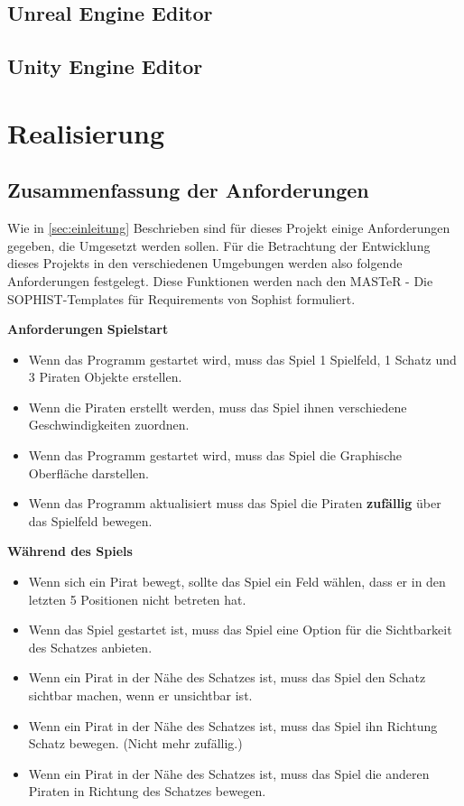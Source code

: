 \documentclass[
	12pt, %
	a4paper,
	listof=totoc, %
	bibliography=totoc, %
	numbers=noenddot, %
	ngerman, %
	headsepline, %
	oneside %
	]{scrbook} %
\begin{document}
\section{Unreal Engine Editor}
\section{Unity Engine Editor}



\chapter{Realisierung}\label{sec:Realisierung}
\section{Zusammenfassung der Anforderungen}
Wie in \ref{sec:einleitung} Beschrieben sind für dieses Projekt einige Anforderungen gegeben, die Umgesetzt werden sollen. Für die Betrachtung der Entwicklung dieses Projekts in den verschiedenen Umgebungen werden also folgende Anforderungen festgelegt.
Diese Funktionen werden nach den \glqq MASTeR - Die SOPHIST-Templates für Requirements\grqq{} von Sophist formuliert\cite{sophist}.

\textbf{Anforderungen}
\textbf{Spielstart}
\begin{itemize}\vspace{-1em}
\setlength{\itemsep}{-1em}
	\item Wenn das Programm gestartet wird, muss das Spiel 1 Spielfeld, 1 Schatz und 3 Piraten Objekte erstellen.
	\item Wenn die Piraten erstellt werden, muss das Spiel ihnen verschiedene Geschwindigkeiten zuordnen.
	\item Wenn das Programm gestartet wird, muss das Spiel die Graphische Oberfläche darstellen.
	\item Wenn das Programm aktualisiert muss das Spiel die Piraten \textbf{zufällig} über das Spielfeld bewegen.
\end{itemize}

\textbf{Während des Spiels}
\begin{itemize}\vspace{-1em}
\setlength{\itemsep}{-1em}
	\item Wenn sich ein Pirat bewegt, sollte das Spiel ein Feld wählen, dass er in den letzten 5 Positionen nicht betreten hat.
	\item Wenn das Spiel gestartet ist, muss das Spiel eine Option für die Sichtbarkeit des Schatzes anbieten.
	\item Wenn ein Pirat in der Nähe des Schatzes ist, muss das Spiel den Schatz sichtbar machen, wenn er unsichtbar ist.
	\item Wenn ein Pirat in der Nähe des Schatzes ist, muss das Spiel ihn Richtung Schatz bewegen. (Nicht mehr zufällig.)
	\item Wenn ein Pirat in der Nähe des Schatzes ist, muss das Spiel die anderen Piraten in Richtung des Schatzes bewegen.
\end{itemize}
\end{document}

